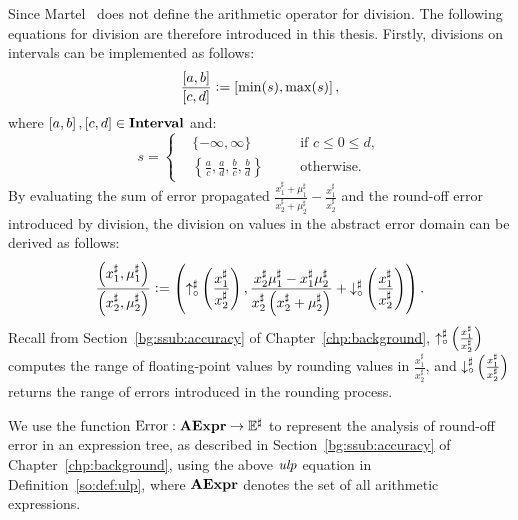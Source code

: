 Since Martel~\cite{martel07} does not define the arithmetic operator for
division.  The following equations for division are therefore introduced in
this thesis.  Firstly, divisions on intervals can be implemented as follows:
\begin{equation}
    \frac{\left[{a}, {b}\right]}{\left[{c}, {d}\right]}
        \vcentcolon= \left[{\min(s)}, {\max(s)}\right],
\end{equation}
where $\left[{a}, {b}\right], \left[{c}, {d}\right] \in \mathbf{Interval}$ and:
\begin{equation}
    s = \left\{
    \begin{aligned}
        & \{ -\infty, \infty \}
            && \text{if~} c \leq 0 \leq d, \\
        & \left\{
            \frac{a}{c}, \frac{a}{d}, \frac{b}{c}, \frac{b}{d}
        \right\}
            \quad && \text{otherwise}.
    \end{aligned}
    \right.
\end{equation}
By evaluating the sum of error propagated $\frac{ x^\sharp_1 + \mu^\sharp_1 }{
x^\sharp_2 + \mu^\sharp_2 } - \frac{x^\sharp_1}{x^\sharp_2}$ and the round-off
error introduced by division, the division on values in the abstract error
domain can be derived as follows:
\begin{equation}
    \frac{
        \left( x^\sharp_1, \mu^\sharp_1 \right)
    }{
        \left( x^\sharp_2, \mu^\sharp_2 \right)
    }
    \vcentcolon= \left(
            \operatorname{\uparrow^\sharp_\circ}\left(\frac{x^\sharp_1}{x^\sharp_2}\right),
            \frac{
                x^\sharp_2 \mu^\sharp_1 - x^\sharp_1 \mu^\sharp_2
            }{
                x^\sharp_2 \left( x^\sharp_2 + \mu^\sharp_2 \right)
            } + \operatorname{\downarrow^\sharp_\circ}\left(\frac{x^\sharp_1}{x^\sharp_2}\right)
        \right).
\end{equation}
Recall from Section~\ref{bg:ssub:accuracy} of Chapter~\ref{chp:background},
$\operatorname{\uparrow^\sharp_\circ}\left(\frac{x^\sharp_1}{x^\sharp_2}\right)$ computes the range of floating-point
values by rounding values in $\frac{x^\sharp_1}{x^\sharp_2}$, and
$\operatorname{\downarrow^\sharp_\circ}\left(\frac{x^\sharp_1}{x^\sharp_2}\right)$ returns the range of errors
introduced in the rounding process.

We use the function $\operatorname{\mathrm{Error}}: \mathbf{AExpr}\to\mathbb{E}^\sharp$ to represent the
analysis of round-off error in an expression tree, as described in
Section~\ref{bg:ssub:accuracy} of Chapter~\ref{chp:background}, using the above
$\operatorname{\mathit{ulp}}$ equation in Definition~\ref{so:def:ulp}, where $\mathbf{AExpr}$ denotes the
set of all arithmetic expressions.

